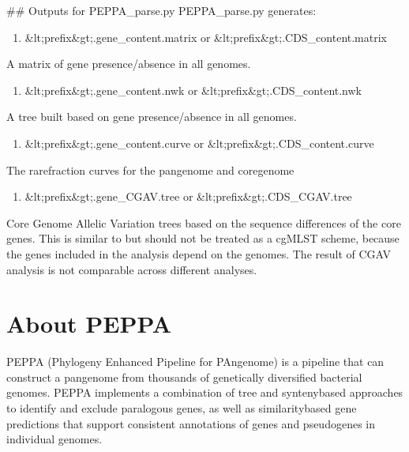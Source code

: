 \documentclass[letterpaper,10pt,english]{sphinxmanual}
\begin{document}
\#\# Outputs for PEPPA\_parse.py
PEPPA\_parse.py generates:
\begin{enumerate}
%
\item {} 
\&lt;prefix\&gt;.gene\_content.matrix or \&lt;prefix\&gt;.CDS\_content.matrix

\end{enumerate}

A matrix of gene presence/absence in all genomes.
\begin{enumerate}
%
\setcounter{enumi}{1}
\item {} 
\&lt;prefix\&gt;.gene\_content.nwk or \&lt;prefix\&gt;.CDS\_content.nwk

\end{enumerate}

A tree built based on gene presence/absence in all genomes.
\begin{enumerate}
%
\setcounter{enumi}{2}
\item {} 
\&lt;prefix\&gt;.gene\_content.curve or \&lt;prefix\&gt;.CDS\_content.curve

\end{enumerate}

The rare\sphinxhyphen{}fraction curves for the pan\sphinxhyphen{}genome and core\sphinxhyphen{}genome
\begin{enumerate}
%
\setcounter{enumi}{3}
\item {} 
\&lt;prefix\&gt;.gene\_CGAV.tree or \&lt;prefix\&gt;.CDS\_CGAV.tree

\end{enumerate}

Core Genome Allelic Variation trees based on the sequence differences of the core genes. This is similar to  but should not be treated as a cgMLST scheme, because the genes included in the analysis depend on the genomes. The result of CGAV analysis is not comparable across different analyses.


\chapter{About PEPPA}
\label{\detokenize{index:about-peppa}}
PEPPA (Phylogeny Enhanced Pipeline for PAn\sphinxhyphen{}genome) is a pipeline that can construct a pan\sphinxhyphen{}genome from thousands of genetically diversified bacterial genomes.
PEPPA implements a combination of tree\sphinxhyphen{} and synteny\sphinxhyphen{}based approaches to identify and exclude paralogous genes,
as well as similarity\sphinxhyphen{}based gene predictions that support consistent annotations of genes and pseudogenes in individual genomes.
\end{document}

